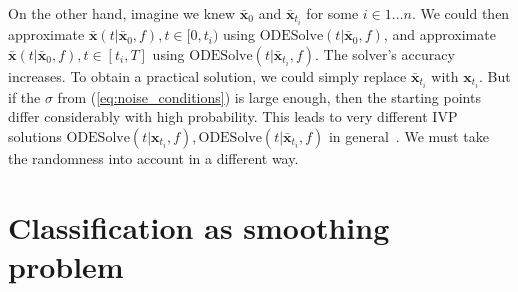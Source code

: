 \documentclass[referee, pdflatex, sn-mathphys-num]{sn-jnl}
\theoremstyle{definition}
\theoremstyle{plain}
\newcommand{\bx}{\ensuremath{\mathbf{x}}}
\newcommand{\bbx}{\ensuremath{\bar{\mathbf{x}}}}
\begin{document}
	On the other hand, imagine we knew $\bbx_0$ and $\bbx_{t_i}$ for some $i \in 1 \ldots n$. We could then approximate $\bbx(t | \bbx_0, f), t \in [0, t_i)$ using $\text{ODESolve}(t | \bbx_0, f)$, and approximate $\bbx(t | \bbx_0, f), t \in [t_i, T]$ using $\text{ODESolve}(t | \bbx_{t_i}, f)$. The solver's accuracy increases. To obtain a practical solution, we could simply replace $\bbx_{t_i}$ with $\bx_{t_i}$. But if the $\sigma$ from (\ref{eq:noise_conditions}) is large enough, then the starting points differ considerably with high probability. This leads to very different IVP solutions $\text{ODESolve}(t | \bx_{t_i}, f), \text{ODESolve}(t | \bbx_{t_i}, f)$ in general~\cite{arnold1992ordinary}. We must take the randomness into account in a different way.
	
	\section{Classification as smoothing problem}
	
\end{document}
